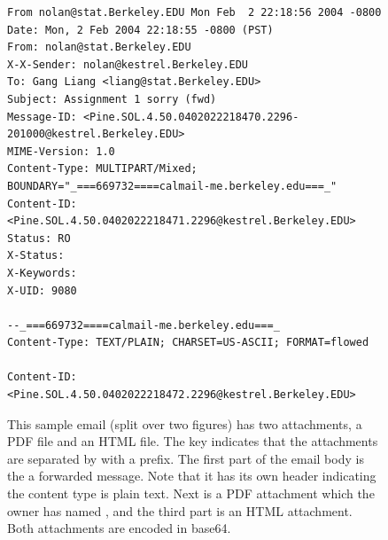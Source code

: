 \begin{figure}
{\footnotesize{
\begin{verbatim}
From nolan@stat.Berkeley.EDU Mon Feb  2 22:18:56 2004 -0800
Date: Mon, 2 Feb 2004 22:18:55 -0800 (PST)
From: nolan@stat.Berkeley.EDU
X-X-Sender: nolan@kestrel.Berkeley.EDU
To: Gang Liang <liang@stat.Berkeley.EDU>
Subject: Assignment 1 sorry (fwd)
Message-ID: <Pine.SOL.4.50.0402022218470.2296-201000@kestrel.Berkeley.EDU>
MIME-Version: 1.0
Content-Type: MULTIPART/Mixed; BOUNDARY="_===669732====calmail-me.berkeley.edu===_"
Content-ID: <Pine.SOL.4.50.0402022218471.2296@kestrel.Berkeley.EDU>
Status: RO
X-Status:
X-Keywords:
X-UID: 9080
 
--_===669732====calmail-me.berkeley.edu===_
Content-Type: TEXT/PLAIN; CHARSET=US-ASCII; FORMAT=flowed
 
Content-ID: <Pine.SOL.4.50.0402022218472.2296@kestrel.Berkeley.EDU>
\end{verbatim}
}}
\caption{This sample email (split over two figures) has two
  attachments, a PDF file and an HTML file.  The 
  key indicates that the attachments are separated by
   with a
  \Email{--} prefix.  The first part of the email body is the a
  forwarded message.  Note that it has its own header indicating the
  content type is plain text.  Next is a PDF attachment which the
  owner has named , and the third part is an HTML
  attachment.  Both attachments are encoded in base64.  }
\end{figure}

